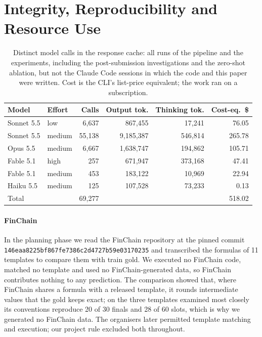 \documentclass[conference]{IEEEtran}
\newcommand{\id}[1]{\texttt{#1}}
\begin{document}
\section{Integrity, Reproducibility and Resource Use}\label{sec:integrity}
\begin{table}[t]
\caption{Distinct model calls in the response cache: all runs of the pipeline and the experiments, including the post-submission investigations and the zero-shot ablation, but not the Claude Code sessions in which the code and this paper were written. Cost is the CLI's list-price equivalent; the work ran on a subscription.}
\label{tab:usage}
\centering
\scriptsize
\begin{tabular}{@{}llrrrr@{}}
\toprule
Model & Effort & Calls & Output tok. & Thinking tok. & Cost-eq.\ \$ \\
\midrule
Sonnet 5.5 & low & 6,637 & 867,455 & 17,241 & 76.05 \\
Sonnet 5.5 & medium & 55,138 & 9,185,387 & 546,814 & 265.78 \\
Opus 5.5 & medium & 6,667 & 1,638,747 & 194,862 & 105.71 \\
Fable 5.1 & high & 257 & 671,947 & 373,168 & 47.41 \\
Fable 5.1 & medium & 453 & 183,122 & 10,969 & 22.94 \\
Haiku 5.5 & medium & 125 & 107,528 & 73,233 & 0.13 \\
\midrule
Total & & 69,277 & & & 518.02 \\
\bottomrule
\end{tabular}
\end{table}

\paragraph*{FinChain}
In the planning phase we read the FinChain repository at the pinned commit \id{146eaa8225bf867fe7386c2d4727b59e03170235} and transcribed the formulas of 11 templates to compare them with train gold. We executed no FinChain code, matched no template and used no FinChain-generated data, so FinChain contributes nothing to any prediction. The comparison showed that, where FinChain shares a formula with a released template, it rounds intermediate values that the gold keeps exact; on the three templates examined most closely its conventions reproduce 20 of 30 finals and 28 of 60 slots, which is why we generated no FinChain data. The organisers later permitted template matching and execution; our project rule excluded both throughout.
\end{document}
